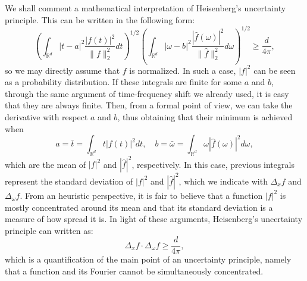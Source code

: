 \documentclass[corpo=11pt, stile=classica, tipotesi=custom,
greek, evenboxes, english]{toptesi}
\numberwithin{equation}{chapter}
\theoremstyle{definition}
\theoremstyle{remark}
\newcommand{\R}{\mathbb{R}} %
\begin{document}
We shall comment a mathematical interpretation of Heisenberg's uncertainty principle. This can be written in the following form:
\begin{equation*}
	\left(\int_{\R^d}|t-a|^2 \dfrac{|f(t)|^2}{\|f\|_2^2} dt\right)^{1/2} \left(\int_{\R^d} |\omega-b|^2 \dfrac{|\hat{f}(\omega)|^2}{\|\hat{f}\|_2^2}d\omega\right)^{1/2} \geq \dfrac{d}{4\pi},
\end{equation*}
so we may directly assume that $f$ is normalized. In such a case, $|f|^2$ can be seen as a probability distribution. If these integrals are finite for some $a$ and $b$, through the same argument of time-frequency shift we already used, it is easy that they are always finite. Then, from a formal point of view, we can take the derivative with respect $a$ and $b$, thus obtaining that their minimum is achieved when
\begin{equation*}
	a = \bar{t} = \int_{\R^d} t |f(t)|^2 dt, \quad b = \bar{\omega} = \int_{\R^d} \omega |\hat{f}(\omega)|^2 d\omega,
\end{equation*}
which are the mean of $|f|^2$ and $|\hat{f}|^2$, respectively. In this case, previous integrals represent the standard deviation of $|f|^2$ and $|\hat{f}|^2$, which we indicate with $\Delta_x f$ and $\Delta_{\omega} f$. From an heuristic perspective, it is fair to believe that a function $|f|^2$ is mostly concentrated around its mean and that its standard deviation is a measure of how spread it is. In light of these arguments, Heisenberg's uncertainty principle can written as:
\begin{equation*}
	\Delta_x f \cdot \Delta_{\omega} f \geq \dfrac{d}{4\pi},
\end{equation*}
which is a quantification of the main point of an uncertainty principle, namely that a function and its Fourier cannot be simultaneously concentrated.
\end{document}
